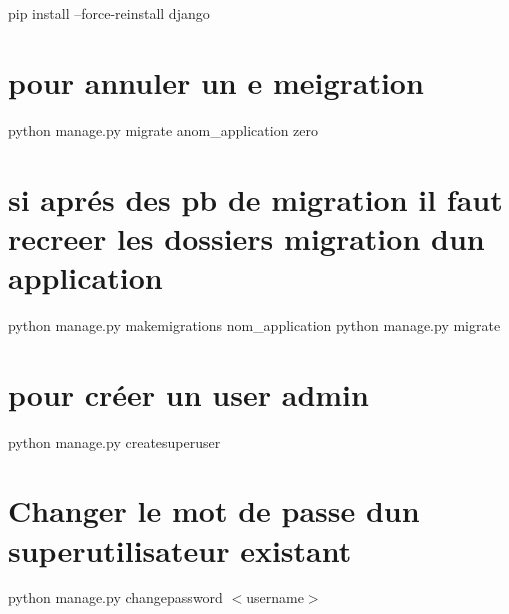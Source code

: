pip install --force-\/reinstall django

\section*{pour annuler un e meigration}

python manage.\+py migrate anom\+\_\+application zero \section*{si aprés des pb de migration il faut recreer les dossiers migration d\textquotesingle{}un application}

python manage.\+py makemigrations nom\+\_\+application python manage.\+py migrate

\section*{pour créer un user admin}

python manage.\+py createsuperuser

\section*{Changer le mot de passe d\textquotesingle{}un superutilisateur existant}

python manage.\+py changepassword $<$username$>$ 